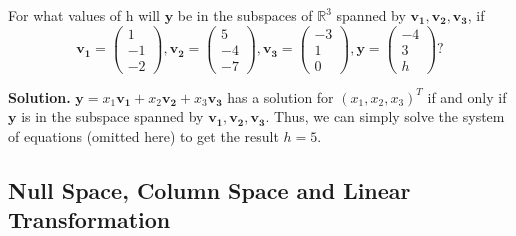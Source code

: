 \documentclass[10pt, a4paper]{article}
\newcommand{\R}{\mathbb{R}}
\begin{document}
\begin{example}
    For what values of h will $\mathbf{y}$ be in the subspaces of $\R^3$ spanned by $\mathbf{v_1}, \mathbf{v_2}, \mathbf{v_3} $, if\[
    \mathbf{v_1} = \begin{pmatrix}
        1\\-1\\-2
    \end{pmatrix},
    \mathbf{v_2} = \begin{pmatrix}
        5\\-4\\-7
    \end{pmatrix},
    \mathbf{v_3} = \begin{pmatrix}
        -3\\1\\0
    \end{pmatrix},
    \mathbf{y} = \begin{pmatrix}
        -4\\3\\h
    \end{pmatrix}?
    \]
\end{example}
\indent\textbf{Solution.} $\mathbf{y}=x_1\mathbf{v_1} + x_2\mathbf{v_2} + x_3\mathbf{v_3}$ has a solution for $(x_1,x_2,x_3)^T$ if and only if $\mathbf{y}$ is in the subspace spanned by $\mathbf{v_1}, \mathbf{v_2}, \mathbf{v_3}$. Thus, we can simply solve the system of equations (omitted here) to get the result $h=5$.

\subsection{Null Space, Column Space and Linear Transformation}
\end{document}
